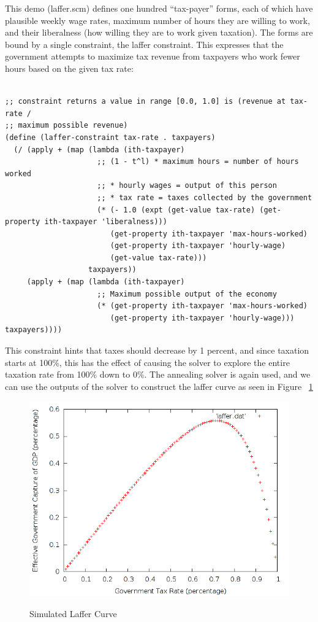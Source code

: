 \documentclass[12pt,a4paper]{article}
\begin{document}
This demo (laffer.scm) defines one hundred ``tax-payer'' forms, each of which have plausible weekly wage rates, maximum number of hours they are willing to work, and their liberalness (how willing they are to work given taxation).  The forms are bound by a single constraint, the laffer constraint. This expresses that the government attempts to maximize tax revenue from taxpayers who work fewer hours based on the given tax rate:
\begin{lstlisting}

;; constraint returns a value in range [0.0, 1.0] is (revenue at tax-rate /
;; maximum possible revenue)
(define (laffer-constraint tax-rate . taxpayers)
  (/ (apply + (map (lambda (ith-taxpayer)
                     ;; (1 - t^l) * maximum hours = number of hours worked
                     ;; * hourly wages = output of this person
                     ;; * tax rate = taxes collected by the government
                     (* (- 1.0 (expt (get-value tax-rate) (get-property ith-taxpayer 'liberalness)))
                        (get-property ith-taxpayer 'max-hours-worked)
                        (get-property ith-taxpayer 'hourly-wage)
                        (get-value tax-rate)))
                   taxpayers))
     (apply + (map (lambda (ith-taxpayer)
                     ;; Maximum possible output of the economy
                     (* (get-property ith-taxpayer 'max-hours-worked)
                        (get-property ith-taxpayer 'hourly-wage))) taxpayers))))
\end{lstlisting}

This constraint hints that taxes should decrease by 1 percent, and since taxation starts at 100\%, this has the effect of causing the solver to explore the entire taxation rate from 100\% down to 0\%.  The annealing solver is again used, and we can use the outputs of the solver to construct the laffer curve as seen in Figure ~\ref{fig:laffer}

\begin{figure}[H]
\caption{Simulated Laffer Curve}
\centering
\includegraphics[scale=.5]{../demos/laffer.png}
\label{fig:laffer}
\end{figure}
\end{document}

